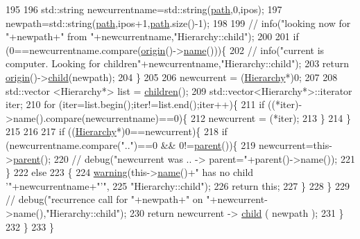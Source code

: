 \begin{DoxyCode}
195 
196       std::string newcurrentname=std::string(\hyperlink{classHierarchy_aa7990fa7caf132d83e361ce033c6c65a}{path},0,ipos);
197       newpath=std::string(\hyperlink{classHierarchy_aa7990fa7caf132d83e361ce033c6c65a}{path},ipos+1,\hyperlink{classHierarchy_aa7990fa7caf132d83e361ce033c6c65a}{path}.size()-1);
198 
199       \textcolor{comment}{//      info("looking now for "+newpath+" from "+newcurrentname,"Hierarchy::child");}
200 
201       \textcolor{keywordflow}{if} (0==newcurrentname.compare(\hyperlink{classHierarchy_aee461dc930ce3871636ff87f075b1b83}{origin}()->\hyperlink{classObject_a300f4c05dd468c7bb8b3c968868443c1}{name}()))\{
202         \textcolor{comment}{//        info("current is computer. Looking for children"+newcurrentname,"Hierarchy::child");}
203         \textcolor{keywordflow}{return} \hyperlink{classHierarchy_aee461dc930ce3871636ff87f075b1b83}{origin}()->\hyperlink{classHierarchy_a1e207f973c694b538bf90107b4868817}{child}(newpath);
204       \}
205 
206       newcurrent = (\hyperlink{classHierarchy}{Hierarchy}*)0;
207 
208       std::vector <Hierarchy*> list = \hyperlink{classHierarchy_aa9a76f69e98e052ee1a6e32cea006288}{children}();
209       std::vector<Hierarchy*>::iterator iter;
210       \textcolor{keywordflow}{for} (iter=list.begin();iter!=list.end();iter++)\{
211         \textcolor{keywordflow}{if} ((*iter)->name().compare(newcurrentname)==0)\{
212           newcurrent = (*iter);
213         \}
214       \}
215 
216 
217       \textcolor{keywordflow}{if} ((\hyperlink{classHierarchy}{Hierarchy}*)0==newcurrent)\{
218         \textcolor{keywordflow}{if} (newcurrentname.compare(\textcolor{stringliteral}{".."})==0 && 0!=\hyperlink{classHierarchy_a1c7bec8257e717f9c1465e06ebf845fc}{parent}())\{
219           newcurrent=this->\hyperlink{classHierarchy_a1c7bec8257e717f9c1465e06ebf845fc}{parent}();
220           \textcolor{comment}{//          debug("newcurrent was .. -> parent="+parent()->name());}
221         \}
222         \textcolor{keywordflow}{else}
223         \{
224           \hyperlink{classObject_a65cd4fda577711660821fd2cd5a3b4c9}{warning}(this->\hyperlink{classObject_a300f4c05dd468c7bb8b3c968868443c1}{name}()+\textcolor{stringliteral}{" has no child '"}+newcurrentname+\textcolor{stringliteral}{"'"},
225               \textcolor{stringliteral}{"Hierarchy::child"});
226           \textcolor{keywordflow}{return} \textcolor{keyword}{this};
227         \}
228       \}
229       \textcolor{comment}{//      debug("recurrence call for "+newpath+" on "+newcurrent->name(),"Hierarchy::child");}
230       \textcolor{keywordflow}{return} newcurrent -> \hyperlink{classHierarchy_a1e207f973c694b538bf90107b4868817}{child} ( newpath );
231     \}
232   \}
233 \}
\end{DoxyCode}
\mbox{\label{classHierarchy_aa9a76f69e98e052ee1a6e32cea006288}} 
